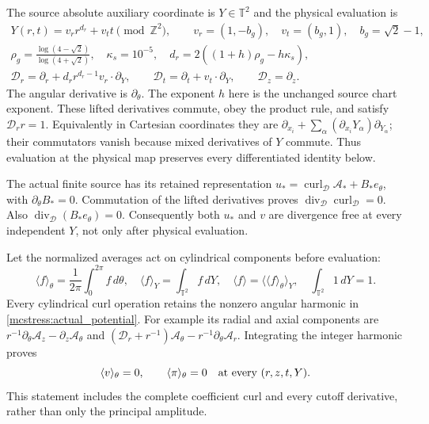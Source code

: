 The source absolute auxiliary coordinate is $Y\in\mathbb T^2$ and
the physical evaluation is
\begin{equation}\label{mcstress:extended_derivatives}
\begin{gathered}
 Y(r,t)=v_r r^{d_r}+v_t t\pmod{\mathbb Z^2},\qquad
 v_r=(1,-b_g),\quad v_t=(b_g,1),\quad b_g=\sqrt2-1,\\
 \rho_g=\frac{\log(4-\sqrt2)}{\log(4+\sqrt2)},\quad
 \kappa_s=10^{-5},\quad d_r=2((1+h)\rho_g-h\kappa_s),\\
 \mathscr D_r=\partial_r+d_r r^{d_r-1}v_r\cdot\partial_Y,
 \qquad \mathscr D_t=\partial_t+v_t\cdot\partial_Y,
 \qquad \mathscr D_z=\partial_z.
\end{gathered}
\end{equation}
The angular derivative is $\partial_\theta$.
The exponent $h$ here is the unchanged source chart exponent. These
lifted derivatives commute, obey the product rule, and satisfy
$\mathscr D_r r=1$. Equivalently in Cartesian coordinates they are
$\partial_{x_i}+\sum_\alpha(\partial_{x_i}Y_\alpha)\partial_{Y_\alpha}$;
their commutators vanish because mixed derivatives of $Y$ commute.
Thus evaluation at the physical map preserves every differentiated
identity below.

The actual finite source has its retained representation
$u_* =\operatorname{curl}_{\mathscr D}\mathcal A_*+B_*e_\theta$,
with $\partial_\theta B_*=0$. Commutation of the lifted derivatives
proves $\operatorname{div}_{\mathscr D}\operatorname{curl}_{\mathscr D}=0$.
Also $\operatorname{div}_{\mathscr D}(B_*e_\theta)=0$.
Consequently both $u_*$ and $v$ are divergence free at every independent
$Y$, not only after physical evaluation.

Let the normalized averages act on cylindrical components before
evaluation:
\[
 \langle f\rangle_\theta=\frac1{2\pi}\int_0^{2\pi}f\,d\theta,
 \quad \langle f\rangle_Y=\int_{\mathbb T^2}f\,dY,
 \quad \langle f\rangle=\langle\langle f\rangle_\theta\rangle_Y,
 \quad\int_{\mathbb T^2}1\,dY=1.
\]
Every cylindrical curl operation retains the nonzero angular harmonic
in \eqref{mcstress:actual_potential}. For example its radial and axial
components are $r^{-1}\partial_\theta\mathcal A_z-\partial_z\mathcal A_\theta$
and $(\mathscr D_r+r^{-1})\mathcal A_\theta-r^{-1}\partial_\theta\mathcal A_r$.
Integrating the integer harmonic proves
\begin{equation}\label{mcstress:zero_mean}
 \langle v\rangle_\theta=0,\qquad
 \langle\pi\rangle_\theta=0
 \quad\hbox{at every }(r,z,t,Y).
\end{equation}
This statement includes the complete coefficient curl and every cutoff
derivative, rather than only the principal amplitude.

